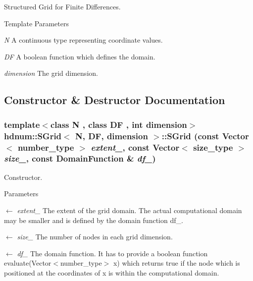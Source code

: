 Structured Grid for Finite Differences. 
\begin{DoxyTemplParams}{Template Parameters}
\item[{\em N}]A continuous type representing coordinate values. \item[{\em DF}]A boolean function which defines the domain. \item[{\em dimension}]The grid dimension. \end{DoxyTemplParams}


\subsection{Constructor \& Destructor Documentation}
\hypertarget{classhdnum_1_1SGrid_ada654dda6b112ebe8c29fef72f917b7b}{
\subsubsection[{SGrid}]{\setlength{\rightskip}{0pt plus 5cm}template$<$class N , class DF , int dimension$>$ {\bf hdnum::SGrid}$<$ N, DF, dimension $>$::{\bf SGrid} (const {\bf Vector}$<$ {\bf number\_\-type} $>$ {\em extent\_\-}, \/  const {\bf Vector}$<$ {\bf size\_\-type} $>$ {\em size\_\-}, \/  const {\bf DomainFunction} \& {\em df\_\-})}}
\label{classhdnum_1_1SGrid_ada654dda6b112ebe8c29fef72f917b7b}


Constructor. 


\begin{DoxyParams}{Parameters}
\item[\mbox{$\leftarrow$} {\em extent\_\-}]The extent of the grid domain. The actual computational domain may be smaller and is defined by the domain function df\_\-.\item[\mbox{$\leftarrow$} {\em size\_\-}]The number of nodes in each grid dimension.\item[\mbox{$\leftarrow$} {\em df\_\-}]The domain function. It has to provide a boolean function evaluate(Vector$<$number\_\-type$>$ x) which returns true if the node which is positioned at the coordinates of x is within the computational domain. \end{DoxyParams}


